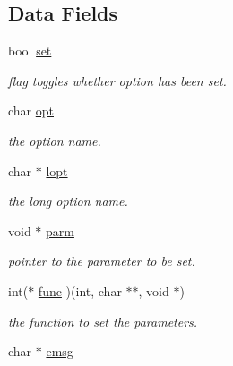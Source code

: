 \subsection*{Data Fields}
\begin{DoxyCompactItemize}
\item 
\hypertarget{classarg__t_a681d5790d7487a756d54d24d4a310611}{bool \hyperlink{classarg__t_a681d5790d7487a756d54d24d4a310611}{set}}\label{classarg__t_a681d5790d7487a756d54d24d4a310611}

\begin{DoxyCompactList}\small\item\em flag toggles whether option has been set. \end{DoxyCompactList}\item 
\hypertarget{classarg__t_adf0074f9886f987e60fc9a111a22dc23}{char \hyperlink{classarg__t_adf0074f9886f987e60fc9a111a22dc23}{opt}}\label{classarg__t_adf0074f9886f987e60fc9a111a22dc23}

\begin{DoxyCompactList}\small\item\em the option name. \end{DoxyCompactList}\item 
\hypertarget{classarg__t_a558ffc8c12be9cc9b6712e23925219c0}{char $\ast$ \hyperlink{classarg__t_a558ffc8c12be9cc9b6712e23925219c0}{lopt}}\label{classarg__t_a558ffc8c12be9cc9b6712e23925219c0}

\begin{DoxyCompactList}\small\item\em the long option name. \end{DoxyCompactList}\item 
\hypertarget{classarg__t_a5395567b0a31949b094774ba6dc6c10d}{void $\ast$ \hyperlink{classarg__t_a5395567b0a31949b094774ba6dc6c10d}{parm}}\label{classarg__t_a5395567b0a31949b094774ba6dc6c10d}

\begin{DoxyCompactList}\small\item\em pointer to the parameter to be set. \end{DoxyCompactList}\item 
\hypertarget{classarg__t_a1056d3714b616261fd36049495026cc0}{int($\ast$ \hyperlink{classarg__t_a1056d3714b616261fd36049495026cc0}{func} )(int, char $\ast$$\ast$, void $\ast$)}\label{classarg__t_a1056d3714b616261fd36049495026cc0}

\begin{DoxyCompactList}\small\item\em the function to set the parameters. \end{DoxyCompactList}\item 
\hypertarget{classarg__t_aab8c1d692c18688ed3e01f04ca7e2ea3}{char $\ast$ \hyperlink{classarg__t_aab8c1d692c18688ed3e01f04ca7e2ea3}{emsg}}\label{classarg__t_aab8c1d692c18688ed3e01f04ca7e2ea3}


\end{DoxyCompactItemize}
